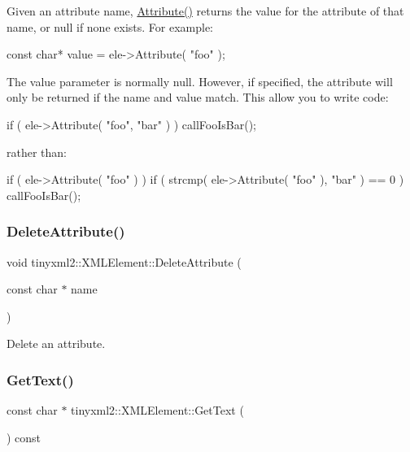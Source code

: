 Given an attribute name, \mbox{\hyperlink{classtinyxml2_1_1_x_m_l_element_a48cf4a315cfbac7d74cd0d5ff2c5df51}{Attribute()}} returns the value for the attribute of that name, or null if none exists. For example\+:

\begin{DoxyVerb}const char* value = ele->Attribute( "foo" );
\end{DoxyVerb}


The \textquotesingle{}value\textquotesingle{} parameter is normally null. However, if specified, the attribute will only be returned if the \textquotesingle{}name\textquotesingle{} and \textquotesingle{}value\textquotesingle{} match. This allow you to write code\+:

\begin{DoxyVerb}if ( ele->Attribute( "foo", "bar" ) ) callFooIsBar();
\end{DoxyVerb}


rather than\+: \begin{DoxyVerb}if ( ele->Attribute( "foo" ) ) {
    if ( strcmp( ele->Attribute( "foo" ), "bar" ) == 0 ) callFooIsBar();
}
\end{DoxyVerb}
 \mbox{\label{classtinyxml2_1_1_x_m_l_element_aebd45aa7118964c30b32fe12e944628a}} 
\subsubsection{\texorpdfstring{DeleteAttribute()}{DeleteAttribute()}}
{\footnotesize\ttfamily void tinyxml2\+::\+X\+M\+L\+Element\+::\+Delete\+Attribute (\begin{DoxyParamCaption}\item[{const char $\ast$}]{name }\end{DoxyParamCaption})}

Delete an attribute. \mbox{\label{classtinyxml2_1_1_x_m_l_element_a0fa5bea0a4daf3ddd503dcabb823eba6}} 
\subsubsection{\texorpdfstring{GetText()}{GetText()}}
{\footnotesize\ttfamily const char $\ast$ tinyxml2\+::\+X\+M\+L\+Element\+::\+Get\+Text (\begin{DoxyParamCaption}{ }\end{DoxyParamCaption}) const}

